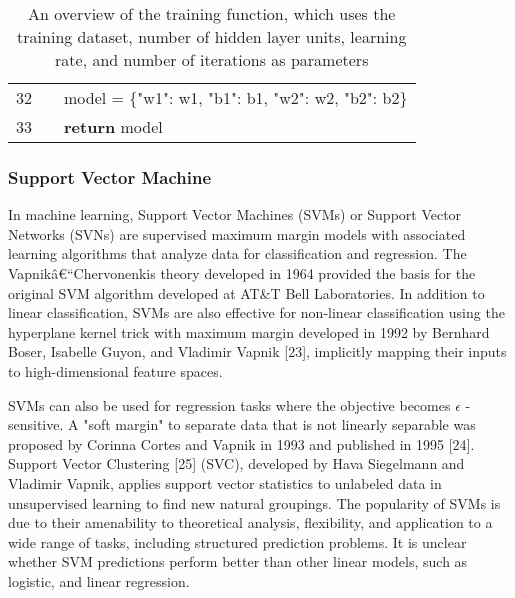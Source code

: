\documentclass[preprint,12pt]{elsarticle}
\begin{document}
\begin{table}[ht]
{\begin{tabular}{|r l l l l|}
            \rowcolor{regularback} \cellcolor{linenumberback} \textcolor{grayhighlight}{32} & & \multicolumn{3}{l|}{model \textcolor{grayhighlight}{=} \{\textcolor{codered}{"w1"}: w1, \textcolor{codered}{"b1"}: b1, \textcolor{codered}{"w2"}: w2, \textcolor{codered}{"b2"}: b2\}} \\
            \rowcolor{regularback} \cellcolor{linenumberback} \textcolor{grayhighlight}{33} & & \multicolumn{3}{l|}{\textcolor{codegreen}{\textbf{return}} model} \\
            \hline
        \end{tabular}
    }
    \caption{An overview of the training function, which uses the training dataset, number of hidden layer units, learning rate, and number of iterations as parameters}
    \label{tab:train}
\end{table}

\subsubsection{Support Vector Machine}

In machine learning, Support Vector Machines (SVMs) or Support Vector Networks (SVNs) are supervised maximum margin models with associated learning algorithms that analyze data for classification and regression. The Vapnikâ€“Chervonenkis theory developed in 1964 provided the basis for the original SVM algorithm developed at AT\&T Bell Laboratories. In addition to linear classification, SVMs are also effective for non-linear classification using the hyperplane kernel trick with maximum margin developed in 1992 by Bernhard Boser, Isabelle Guyon, and Vladimir Vapnik [23], implicitly mapping their inputs to high-dimensional feature spaces. 

SVMs can also be used for regression tasks where the objective becomes $\epsilon$ -sensitive. A "soft margin" to separate data that is not linearly separable was proposed by Corinna Cortes and Vapnik in 1993 and published in 1995 [24]. Support Vector Clustering [25] (SVC), developed by Hava Siegelmann and Vladimir Vapnik, applies support vector statistics to unlabeled data in unsupervised learning to find new natural groupings. The popularity of SVMs is due to their amenability to theoretical analysis, flexibility, and application to a wide range of tasks, including structured prediction problems. It is unclear whether SVM predictions perform better than other linear models, such as logistic, and linear regression.
\end{document}
